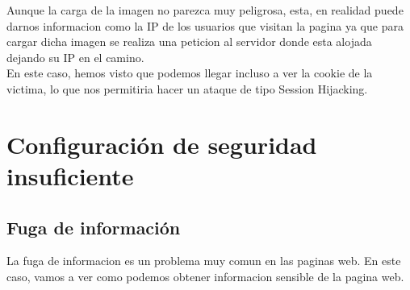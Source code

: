 \documentclass{report}
\begin{document}
                Aunque la carga de la imagen no parezca muy peligrosa, esta, en realidad puede darnos informacion como la IP de los usuarios que visitan la pagina ya que para cargar dicha imagen se realiza una peticion al servidor donde esta alojada dejando su IP en el camino.\\

                En este caso, hemos visto que podemos llegar incluso a ver la cookie de la victima, lo que nos permitiria hacer un ataque de tipo Session Hijacking.\\
                
                \clearpage
        \section{Configuración de seguridad insuficiente}
            \subsection{Fuga de información}
                La fuga de informacion es un problema muy comun en las paginas web.
                En este caso, vamos a ver como podemos obtener informacion sensible de la pagina web.\\
\end{document}
